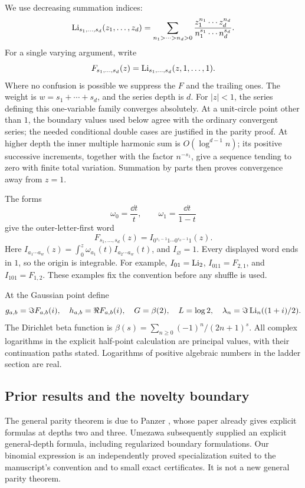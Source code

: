 We use decreasing summation indices:
\[
\operatorname{Li}_{s_1,\ldots,s_d}(z_1,\ldots,z_d)
=\sum_{n_1>\cdots>n_d>0}
\frac{z_1^{n_1}\cdots z_d^{n_d}}
{n_1^{s_1}\cdots n_d^{s_d}}.
\]
For a single varying argument, write
\[
F_{s_1,\ldots,s_d}(z)
=\operatorname{Li}_{s_1,\ldots,s_d}(z,1,\ldots,1).
\]
Where no confusion is possible we suppress the \(F\) and the trailing
ones. The weight is \(w=s_1+\cdots+s_d\), and the series depth is \(d\).
For \(|z|<1\), the series defining this one-variable family converges
absolutely. At a unit-circle point other than \(1\), the boundary values
used below agree with the ordinary convergent series; the needed
conditional double cases are justified in the parity proof. At higher
depth the inner multiple harmonic sum is \(O(\log^{d-1}n)\); its positive
successive increments, together with the factor \(n^{-s_1}\), give a
sequence tending to zero with finite total variation. Summation by parts
then proves convergence away from \(z=1\).

The forms
\[
\omega_0=\frac{\dd t}{t},\qquad
\omega_1=\frac{\dd t}{1-t}
\]
give the outer-letter-first word
\[
F_{s_1,\ldots,s_d}(z)
=I_{0^{s_1-1}1\cdots0^{s_d-1}1}(z).
\]
Here \(I_{a_1\cdots a_w}(z)=\int_0^z\omega_{a_1}(t)
I_{a_2\cdots a_w}(t)\), and \(I_{\varnothing}=1\).
Every displayed word ends in \(1\), so the origin is integrable.
For example, \(I_{01}=\operatorname{Li}_2\),
\(I_{011}=F_{2,1}\), and \(I_{101}=F_{1,2}\).
These examples fix the convention before any shuffle is used.

At the Gaussian point define
\[
g_{a,b}=\Im F_{a,b}(i),\quad
h_{a,b}=\Re F_{a,b}(i),\quad
G=\beta(2),\quad L=\log2,\quad
\lambda_n=\Im\operatorname{Li}_n((1+i)/2).
\]
The Dirichlet beta function is
\(\beta(s)=\sum_{n\ge0}(-1)^n/(2n+1)^s\).
All complex logarithms in the explicit half-point calculation are
principal values, with their continuation paths stated.
Logarithms of positive algebraic numbers in the ladder section are real.

\subsection{Prior results and the novelty boundary}

The general parity theorem is due to Panzer \cite{Panzer}, whose paper
already gives explicit formulas at depths two and three.
Umezawa \cite{Umezawa} subsequently supplied an explicit general-depth
formula, including regularized boundary formulations.
Our binomial expression is an independently proved specialization suited
to the manuscript's convention and to small exact certificates.
It is not a new general parity theorem.

